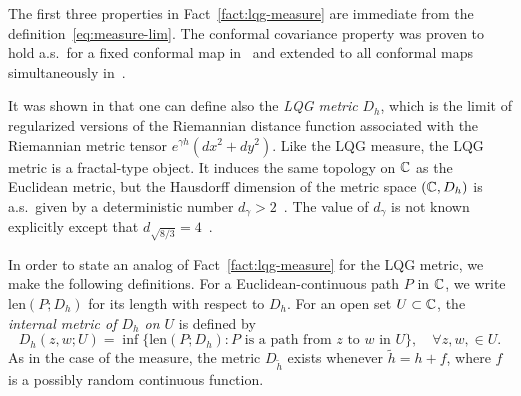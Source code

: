 \documentclass[12pt]{amsart}
\numberwithin{equation}{section}
\begin{document}
	The first three properties in Fact~\ref{fact:lqg-measure} are immediate from the definition~\eqref{eq:measure-lim}. The conformal covariance property was proven to hold a.s.\ for a fixed conformal map in~\cite[Proposition 2.1]{duplantier2011liouville} and extended to all conformal maps simultaneously in~\cite{sheffield2016field}.
	
	It was shown in \cite{ding2020tightness, gwynne2021existence} that one can define also the {\it LQG metric} $D_h$, 
	which is the limit of regularized versions of the Riemannian distance function associated with the Riemannian metric tensor $e^{\gamma h}(d x^2 + dy^2)$.
	Like the LQG measure, the LQG metric is a fractal-type object. It induces the same topology on $\mathbb{C}$ as the Euclidean metric, but the Hausdorff dimension of the metric space $(\mathbb{C} , D_h)$ is a.s.\ given by a deterministic number $d_\gamma > 2$~\cite[Corollary 1.7]{gp-kpz}. The value of $d_\gamma$ is not known explicitly except that $d_{\sqrt{8/3}}=4$~\cite{le2007topological}. 
	
	In order to state an analog of Fact~\ref{fact:lqg-measure} for the LQG metric, we make the following definitions. For a Euclidean-continuous path $P$ in $\mathbb{C}$, we write $\mathrm{len}(P; D_h)$ for its length with respect to $D_h$.  
	For an open set $U \subset \mathbb{C}$, the {\it internal metric of $D_h$ on $U$}
	is defined by 
	\begin{equation} \label{eq:internal-metric}
	D_h(z,w; U) = \inf \{ \mathrm{len}(P; D_h) : \mbox{$P$ is a path from $z$ to $w$ in $U$}\}, \quad \mbox{$\forall z,w, \in U$}.
	\end{equation}
	As in the case of the measure, the metric $D_{\tilde h}$ exists whenever $\tilde h = h + f$, where $f$ is a possibly random continuous function. 
	
\end{document}

